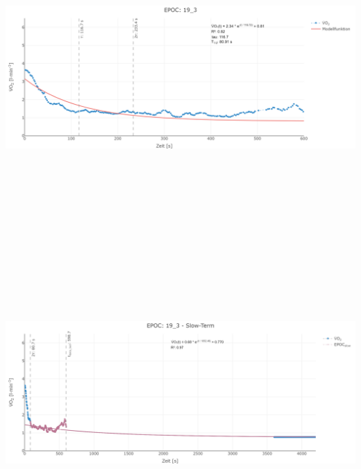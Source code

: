 \documentclass[
  letterpaper,
  DIV=11]{scrartcl}
\begin{document}
\includegraphics[width=11.45833in,height=4.6875in]{images/19_3_tau.png}
\includegraphics[width=11.45833in,height=4.6875in]{images/19_3_slow.png}
\end{document}
